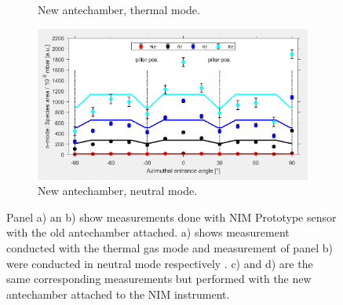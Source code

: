 \begin{figure}[h!]
\begin{subfigure}[b]{.5\textwidth}
			\caption{New antechamber, thermal mode.}
		\end{subfigure}
		\begin{subfigure}[b]{.5\textwidth}
			\centering
			\includegraphics[width=\textwidth]{Experiments/newAnte_NMode.png}
			\caption{New antechamber, neutral mode.}
		\end{subfigure}
		\caption{Panel a) an b) show measurements done with NIM Prototype sensor with the old antechamber attached. a) shows measurement conducted with the thermal gas mode and measurement of panel b) were conducted in neutral mode respectively \cite{Meyer_2017_ante}. c) and d) are the same corresponding measurements but performed with the new antechamber attached to the NIM instrument.}
		\label{fig:AnteMeasData}
	\end{figure}

